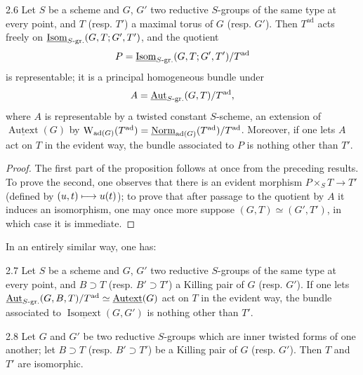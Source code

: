 \begin{proposition}{2.6}\label{XXIV.2.6}
Let $S$ be a scheme and $G$, $G'$ two reductive $S$-groups of the same type at every point, and $T$ (resp. $T'$) a maximal torus of $G$ (resp. $G'$). Then $T^{\mathrm{ad}}$ acts freely on $\underline{\operatorname{Isom}}_{S\text{-gr.}}(G,T;G',T')$, and the quotient
\[
P=\underline{\operatorname{Isom}}_{S\text{-gr.}}(G,T;G',T')/T^{\mathrm{ad}}
\]
is representable; it is a principal homogeneous bundle under
\[
A=\underline{\operatorname{Aut}}_{S\text{-gr.}}(G,T)/T^{\mathrm{ad}},
\]
where $A$ is representable by a twisted constant $S$-scheme, an extension of $\underline{\operatorname{Autext}}(G)$ by $\mathrm W_{\operatorname{ad}(G)}(T^{\mathrm{ad}})=\underline{\mathrm{Norm}}_{\operatorname{ad}(G)}(T^{\mathrm{ad}})/T^{\mathrm{ad}}$. Moreover, if one lets $A$ act on $T$ in the evident way, the bundle associated to $P$ is nothing other than $T'$.
\end{proposition}
\begin{proof}
The first part of the proposition follows at once from the preceding results. To prove the second, one observes that there is an evident morphism $P\times_S T\to T'$ (defined by $(u,t)\longmapsto u(t)$); to prove that after passage to the quotient by $A$ it induces an isomorphism, one may once more suppose $(G,T)\simeq(G',T')$, in which case it is immediate.
\end{proof}
In an entirely similar way, one has:
\begin{proposition}{2.7}\label{XXIV.2.7}
Let $S$ be a scheme and $G$, $G'$ two reductive $S$-groups of the same type at every point, and $B\supset T$ (resp. $B'\supset T'$) a Killing pair of $G$ (resp. $G'$). If one lets $\underline{\operatorname{Aut}}_{S\text{-gr.}}(G,B,T)/T^{\mathrm{ad}}\simeq\underline{\operatorname{Autext}}(G)$ act on $T$ in the evident way, the bundle associated to $\underline{\operatorname{Isomext}}(G,G')$ is nothing other than $T'$.
\end{proposition}
\begin{corollary}{2.8}\label{XXIV.2.8}
Let $G$ and $G'$ be two reductive $S$-groups which are inner twisted forms of one another; let $B\supset T$ (resp. $B'\supset T'$) be a Killing pair of $G$ (resp. $G'$). Then $T$ and $T'$ are isomorphic.
\end{corollary}
